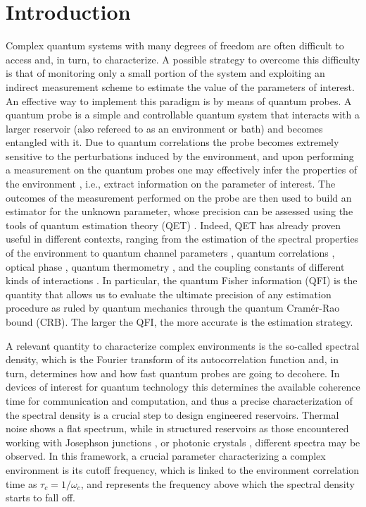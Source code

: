 \documentclass[ pra,a4paper,aps,twocolumn,superscriptaddress]{revtex4-1}
\def\tc#1{{\color{black}#1}}
\begin{document}
\section{Introduction}
Complex quantum systems with many degrees of freedom are often difficult 
to access and, in turn, to characterize. A possible strategy to overcome 
this difficulty is that of monitoring only a small portion of the system 
and exploiting an indirect measurement scheme to estimate the value of the 
parameters of interest. 
An effective way to implement this paradigm is by means of quantum probes.
A quantum probe is a simple and controllable quantum system that interacts 
with a larger reservoir (also refereed to as an environment or bath) and becomes 
entangled  with it. Due to quantum correlations the probe becomes extremely
sensitive to the perturbations induced by the environment, and upon performing 
a measurement on the quantum probes one may effectively infer the properties 
of the environment 
\cite{breuer2002theory,abdelrahman,elliott,streif16,troiani16,cosco17}, i.e., extract 
information on the parameter of interest. The outcomes of the measurement 
performed on the probe are then used to build an estimator for the unknown 
parameter, whose precision can be assessed using  the tools of quantum 
estimation theory (QET) \cite{parisQE}. Indeed, QET has already proven useful
in different contexts, ranging from the estimation of the spectral properties 
of the environment \cite{benedetti2014,benedetti14, zwick16} to quantum channel 
parameters \cite{monras07,fujiwara01,fujiwara03,pinel13}, quantum correlations 
\cite{brida10, brida11, blandino12, benedetti13}, optical phase \cite{monras06, 
allevi, kacprowicz10, genoni11, spagnolo12}, quantum thermometry \cite{brunelli11,
correa15}, and the coupling constants of different kinds of 
interactions \cite{stenberg14,bina16,tuffa,tama16,nokkala17}. In particular, 
the quantum Fisher information (QFI) is the quantity that allows us to evaluate  
the ultimate precision of any estimation procedure as ruled by quantum mechanics through 
the quantum Cram\'er-Rao bound (CRB). The larger the QFI, the more accurate is the estimation 
strategy. 
\par
\tc{A relevant quantity to characterize complex environments is the so-called 
spectral density, which is the Fourier transform of its autocorrelation function 
and, in turn, determines how and how fast quantum probes are going to decohere.
In devices of interest for quantum technology this determines the available 
coherence time for communication and computation, and thus a precise characterization
of the spectral density is a crucial step to design engineered reservoirs.  
Thermal noise shows a flat spectrum, while in structured reservoirs as those
encountered working with Josephson junctions \cite{ast06}, or photonic crystals \cite{jan95}, 
different spectra may be observed. In this framework, a crucial parameter 
characterizing a complex environment is its cutoff frequency, 
which is linked to the environment correlation time as $\tau_c=1/\omega_c$, 
and represents the frequency above which the spectral density starts 
to fall off. }
\end{document}
